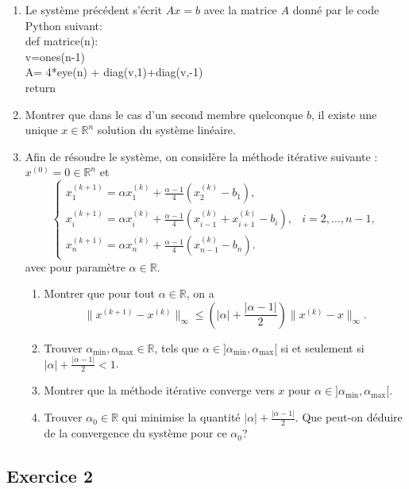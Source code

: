 \documentclass{article}
\renewcommand{\leq}{\leqslant}
\newcommand{\1}{\ensuremath{\mathbbm{1}}}
\begin{document}
\begin{enumerate}
\begin{enumerate}
        \item Ainsi on a pour tout $i \in \{1, \ldots, n\},$ $|x_i|\leq \frac{1}{2}\|x\|_{\infty}$. Or si $\|x\|_{\infty}\neq 0,$ il existe $i_0  \in \{1, \ldots, n\}$ tel que $\|x\|_{\infty}=|x_{i_{0}}|\neq 0$ ce qui contredit l'in\'egalit\'e pr\'ec\'edente.
    \end{enumerate}
\item Le syst\`eme pr\'ec\'edent s'\'ecrit $Ax=b$ avec la matrice $A$ donn\'e par le code Python suivant: \\
def matrice(n):\\
	v=ones(n-1)\\
	A= 4*eye(n) + diag(v,1)+diag(v,-1)\\
	return \\
    \item Montrer que dans le cas d’un second membre quelconque $b$, il existe une unique $x \in \mathbb{R}^n$ solution du système linéaire.
    \item Afin de résoudre le système, on considère la méthode itérative suivante : $x^{(0)} = 0 \in \mathbb{R}^n$ et
    \[
    \begin{cases}
    x^{(k+1)}_1 = \alpha x^{(k)}_1 + \frac{\alpha - 1}{4} (x^{(k)}_2 - b_1), \\
    x^{(k+1)}_i = \alpha x^{(k)}_i + \frac{\alpha - 1}{4} (x^{(k)}_{i-1} + x^{(k)}_{i+1} - b_i), & i = 2, \ldots, n - 1, \\
    x^{(k+1)}_n = \alpha x^{(k)}_n + \frac{\alpha - 1}{4} (x^{(k)}_{n-1} - b_n).
    \end{cases}
    \]
    avec pour paramètre $\alpha \in \mathbb{R}$. 
    \begin{enumerate}
        \item Montrer que pour tout $\alpha \in \mathbb{R}$, on a
        \[
        \|x^{(k+1)} - x^{(k)}\|_\infty \leq \left(|\alpha| + \frac{|\alpha - 1|}{2}\right) \|x^{(k)} - x\|_\infty.
        \]
        \item Trouver $\alpha_{\text{min}}, \alpha_{\text{max}} \in \mathbb{R}$, tels que $\alpha \in ]\alpha_{\text{min}}, \alpha_{\text{max}}[$ si et seulement si $|\alpha| + \frac{|\alpha - 1|}{2} < 1$.
        \item Montrer que la méthode itérative converge vers $x$ pour $\alpha \in ]\alpha_{\text{min}}, \alpha_{\text{max}}[$.
        \item Trouver $\alpha_0 \in \mathbb{R}$ qui minimise la quantité $|\alpha| + \frac{|\alpha - 1|}{2}.$ Que peut-on d\'eduire de la convergence du syst\`eme pour ce $\alpha_0$?

    \end{enumerate}
\end{enumerate}



\subsection*{Exercice 2}
\end{document}
